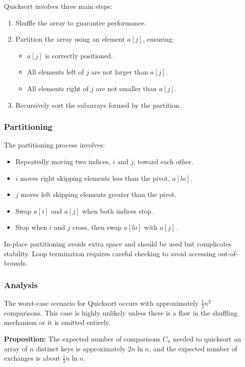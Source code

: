 \documentclass{article}
\begin{document}
Quicksort involves three main steps: 
\begin{enumerate}
  \item Shuffle the array to guarantee performance.
  \item Partition the array using an element $a[j]$, ensuring:
    \begin{itemize}
      \item $a[j]$ is correctly positioned.
      \item All elements left of $j$ are not larger than $a[j]$.
      \item All elements right of $j$ are not smaller than $a[j]$.
    \end{itemize}
  \item Recursively sort the subarrays formed by the partition.
\end{enumerate}

\subsubsection{Partitioning}

The partitioning process involves:
\begin{itemize}
  \item Repeatedly moving two indices, $i$ and $j$, toward each other.
  \item $i$ moves right skipping elements less than the pivot, $a[lo]$.
  \item $j$ moves left skipping elements greater than the pivot.
  \item Swap $a[i]$ and $a[j]$ when both indices stop.
  \item Stop when $i$ and $j$ cross, then swap $a[lo]$ with $a[j]$.
\end{itemize}

In-place partitioning avoids extra space and should be used but complicates stability. Loop termination requires careful checking to avoid accessing out-of-bounds.

\subsubsection{Analysis}

The worst-case scenario for Quicksort occurs with approximately $\frac{1}{2} n^2$ comparisons. This case is highly unlikely unless there is a flaw in the shuffling mechanism or it is omitted entirely. 

\textbf{Proposition:} The expected number of comparisons $C_n$ needed to quicksort an array of $n$ distinct keys is approximately $2n \ln n$, and the expected number of exchanges is about $\frac{1}{3} n \ln n$.
\end{document}
